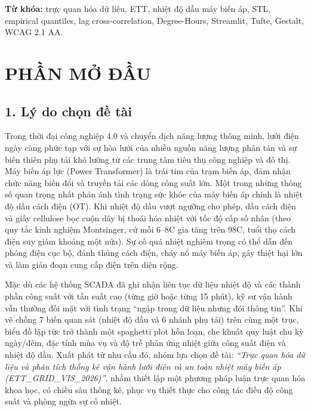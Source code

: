 \documentclass[12pt,a4paper,oneside]{report}
\newcommand{\dC}{\textdegree C\xspace}
\begin{document}
\noindent\textbf{Từ khóa:} trực quan hóa dữ liệu, ETT, nhiệt độ dầu máy biến áp, STL, empirical quantiles, lag cross-correlation, Degree-Hours, Streamlit, Tufte, Gestalt, WCAG 2.1 AA.

\chapter*{PHẦN MỞ ĐẦU}
\setcounter{page}{1}

\section*{1. Lý do chọn đề tài}

Trong thời đại công nghiệp 4.0 và chuyển dịch năng lượng thông minh, lưới điện ngày càng phức tạp với sự hòa lưới của nhiều nguồn năng lượng phân tán và sự biến thiên phụ tải khó lường từ các trung tâm tiêu thụ công nghiệp và đô thị. Máy biến áp lực (Power Transformer) là trái tim của trạm biến áp, đảm nhận chức năng biến đổi và truyền tải các dòng công suất lớn. Một trong những thông số quan trọng nhất phản ánh tình trạng sức khỏe của máy biến áp chính là nhiệt độ dầu cách điện (OT). Khi nhiệt độ dầu vượt ngưỡng cho phép, dầu cách điện và giấy cellulose bọc cuộn dây bị thoái hóa nhiệt với tốc độ cấp số nhân (theo quy tắc kinh nghiệm Montsinger, cứ mỗi 6--8\dC gia tăng trên 98\dC, tuổi thọ cách điện suy giảm khoảng một nửa). Sự cố quá nhiệt nghiêm trọng có thể dẫn đến phóng điện cục bộ, đánh thủng cách điện, cháy nổ máy biến áp, gây thiệt hại lớn và làm gián đoạn cung cấp điện trên diện rộng.

Mặc dù các hệ thống SCADA đã ghi nhận liên tục dữ liệu nhiệt độ và các thành phần công suất với tần suất cao (từng giờ hoặc từng 15 phút), kỹ sư vận hành vẫn thường đối mặt với tình trạng ``ngập trong dữ liệu nhưng đói thông tin''. Khi vẽ chồng 7 biến quan sát (nhiệt độ dầu và 6 nhánh phụ tải) trên cùng một trục, biểu đồ lập tức trở thành một spaghetti plot hỗn loạn, che khuất quy luật chu kỳ ngày/đêm, đặc tính mùa vụ và độ trễ phản ứng nhiệt giữa công suất điện và nhiệt độ dầu. Xuất phát từ nhu cầu đó, nhóm lựa chọn đề tài: \textit{``Trực quan hóa dữ liệu và phân tích thống kê vận hành lưới điện và an toàn nhiệt máy biến áp (ETT\_GRID\_VIS\_2026)''}, nhằm thiết lập một phương pháp luận trực quan hóa khoa học, có chiều sâu thống kê, phục vụ thiết thực cho công tác điều độ công suất và phòng ngừa sự cố nhiệt.
\end{document}
